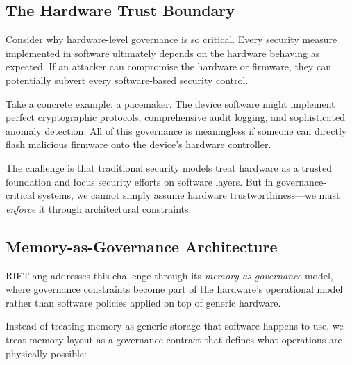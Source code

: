 \subsection{The Hardware Trust Boundary}

Consider why hardware-level governance is so critical. Every security measure implemented in software ultimately depends on the hardware behaving as expected. If an attacker can compromise the hardware or firmware, they can potentially subvert every software-based security control.

Take a concrete example: a pacemaker. The device software might implement perfect cryptographic protocols, comprehensive audit logging, and sophisticated anomaly detection. All of this governance is meaningless if someone can directly flash malicious firmware onto the device's hardware controller.

The challenge is that traditional security models treat hardware as a trusted foundation and focus security efforts on software layers. But in governance-critical systems, we cannot simply assume hardware trustworthiness—we must \textit{enforce} it through architectural constraints.

\subsection{Memory-as-Governance Architecture}

RIFTlang addresses this challenge through its \textit{memory-as-governance} model, where governance constraints become part of the hardware's operational model rather than software policies applied on top of generic hardware.

Instead of treating memory as generic storage that software happens to use, we treat memory layout as a governance contract that defines what operations are physically possible:

